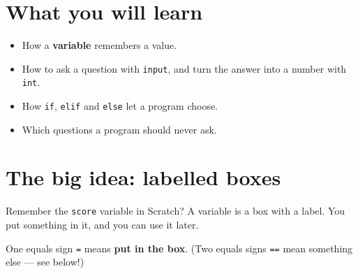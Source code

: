 
\section{What you will learn}
\begin{itemize}[leftmargin=1.2em,itemsep=1pt]
  \item How a \textbf{variable} remembers a value.
  \item How to ask a question with \texttt{input}, and turn the answer into a number with \texttt{int}.
  \item How \texttt{if}, \texttt{elif} and \texttt{else} let a program choose.
  \item Which questions a program should never ask.
\end{itemize}

\section{The big idea: labelled boxes}
Remember the \texttt{score} variable in Scratch? A variable is a box with a label. You put something in it, and you can use it later.
\begin{center}
\end{center}
One equals sign \texttt{=} means \textbf{put in the box}. (Two equals signs \texttt{==} mean something else --- see below!)

